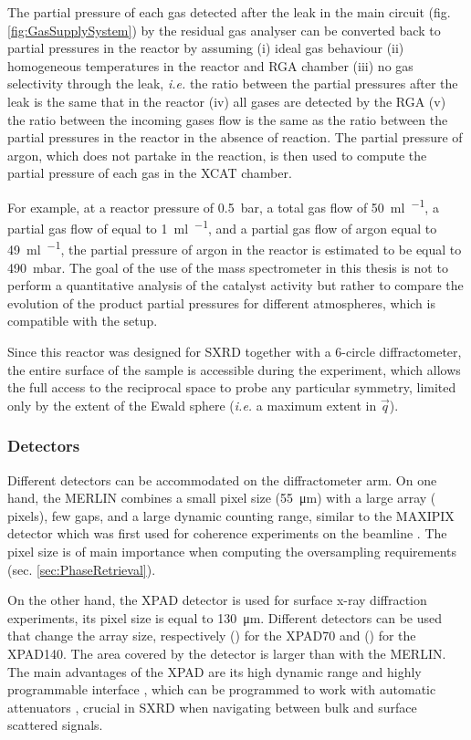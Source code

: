 The partial pressure of each gas detected after the leak in the main circuit (fig. \ref{fig:GasSupplySystem}) by the residual gas analyser can be converted back to partial pressures in the reactor by assuming (i) ideal gas behaviour (ii) homogeneous temperatures in the reactor and RGA chamber (iii) no gas selectivity through the leak, \textit{i.e.} the ratio between the partial pressures after the leak is the same that in the reactor (iv) all gases are detected by the RGA (v) the ratio between the incoming gases flow is the same as the ratio between the partial pressures in the reactor in the absence of reaction.
The partial pressure of argon, which does not partake in the reaction, is then used to compute the partial pressure of each gas in the XCAT chamber.

For example, at a reactor pressure of \qty{0.5}{\bar}, a total gas flow of \qty{50}{\ml\per\min}, a partial gas flow of  equal to \qty{1}{\ml\per\min}, and a partial gas flow of argon equal to \qty{49}{\ml\per\min}, the partial pressure of argon in the reactor is estimated to be equal to \qty{490}{\milli\bar}.
The goal of the use of the mass spectrometer in this thesis is not to perform a quantitative analysis of the catalyst activity but rather to compare the evolution of the product partial pressures for different atmospheres, which is compatible with the setup.

Since this reactor was designed for SXRD together with a 6-circle diffractometer, the entire surface of the sample is accessible during the experiment, which allows the full access to the reciprocal space to probe any particular symmetry, limited only by the extent of the Ewald sphere (\textit{i.e.} a maximum extent in $\vec{q}$).

\subsubsection{Detectors}

Different detectors can be accommodated on the diffractometer arm.
On one hand, the MERLIN \parencite{Bewley2006} combines a small pixel size (\qty{55}{\um}) with a large array ( pixels), few gaps, and a large dynamic counting range, similar to the MAXIPIX detector \parencite{Ponchut2011} which was first used for coherence experiments on the beamline \parencite{Schavkan2013, Li2020}.
The pixel size is of main importance when computing the oversampling requirements (sec. \ref{sec:PhaseRetrieval}).

On the other hand, the XPAD detector \parencite{Basolo2005, Dawiec2016} is used for surface x-ray diffraction experiments, its pixel size is equal to \qty{130}{\um}.
Different detectors can be used that change the array size, respectively () for the XPAD70 and () for the XPAD140.
The area covered by the detector is larger than with the MERLIN.
The main advantages of the XPAD are its high dynamic range and highly programmable interface \parencite{Fertey2013}, which can be programmed to work with automatic attenuators \parencite{Dawiec2016}, crucial in SXRD when navigating between bulk and surface scattered signals.
